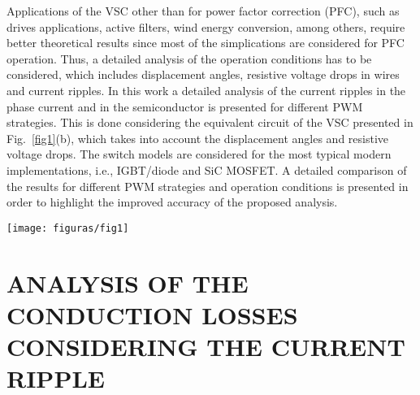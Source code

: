 \documentclass[10pt, onecolumn,conference]{IEEEtran}
\begin{document}
Applications of the VSC other than for power factor correction (PFC), such as drives applications, active filters, wind energy conversion, among others, require better theoretical results since most of the simplications are considered for PFC operation. Thus, a detailed analysis of the operation conditions has to be considered, which includes displacement angles, resistive voltage drops in wires and current ripples. In this work a detailed analysis of the current ripples in the phase current and in the semiconductor is presented for different PWM strategies. This is done considering the equivalent circuit of the VSC presented in Fig.~\ref{fig1}(b), which takes into account the displacement angles and resistive voltage drops. The switch models are considered for the most typical modern implementations, i.e., IGBT/diode  and SiC MOSFET. A detailed comparison of the results for different PWM strategies and operation conditions is presented in order to highlight the improved accuracy of the proposed analysis.

\begin{figure*}[bp!]
	\centering
	\texttt{[image: figuras/fig1]}
	\caption{{(a) Three-phase two-level voltage source converter (VSC) topology; (b) Equivalent circuit diagram of the VSC including the ac-port resistive losses; and, (c) Voltage space vectors, their correspondents switching states and sextants ($S_{\textrm{I}}$, $S_{\textrm{II}}$, $S_{\textrm{III}}$, $S_{\textrm{IV}}$, $S_{\textrm{V}}$ and $S_{\textrm{VI}}$) definition . In the voltage space vector, the voltage vectors are related with the $\alpha\beta$ duty-cycle functions with $\vec{d}_{\alpha\beta}V_{dc}\!=\!d_1\vec{V}_1\!+\!d_2\vec{V}_2$ for sextant $S_\textrm{I}$, the others sextants follow a similar relation, where $d_j$ is the correspondent duty-cycle function for vector $\vec{V}_j$.}}
	\label{fig1}
\end{figure*}

\section{\MakeUppercase{Analysis of the Conduction Losses Considering the Current Ripple}}%
\end{document}
